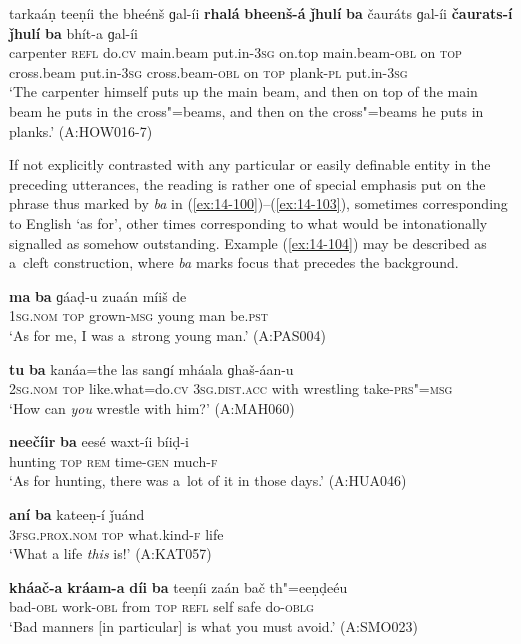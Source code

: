 \begin{exe}
\ex
\label{ex:14-99}
\gll tarkaáṇ teeṇíi the bheénš ɡal-íi  \textbf{rhalá} \textbf{bheenš-á} \textbf{ǰhulí} \textbf{ba} čauráts ɡal-íi \textbf{čaurats-í} \textbf{ǰhulí} \textbf{ba} bhít-a ɡal-íi\\
carpenter \textsc{refl} do.\textsc{cv} main.beam put.in-\textsc{3sg} on.top main.beam-\textsc{obl} on \textsc{top} cross.beam put.in-\textsc{3sg} cross.beam-\textsc{obl} on \textsc{top} plank-\textsc{pl} put.in-\textsc{3sg}\\
\glt `The carpenter himself puts up the main beam, and then on top of the main beam he puts in the cross"=beams, and then on the cross"=beams he puts in planks.' (A:HOW016-7)
\end{exe}

If not explicitly contrasted with any particular or easily definable entity in the preceding utterances, the reading is rather one of special emphasis put on the phrase thus marked by \textit{ba} in (\ref{ex:14-100})--(\ref{ex:14-103}), sometimes corresponding to English `as for', other times corresponding to what would be intonationally signalled as somehow outstanding. Example (\ref{ex:14-104}) may be described as a~cleft construction, where \textit{ba} marks focus that precedes the background.

\begin{exe}
\ex
\label{ex:14-100}
\gll \textbf{ma} \textbf{ba} ɡáaḍ-u zuaán míiš de \\
\textsc{1sg.nom} \textsc{top} grown-\textsc{msg} young man be.\textsc{pst}  \\
\glt `As for me, I was a~strong young man.' (A:PAS004)

\ex
\label{ex:14-101}
\gll \textbf{tu} \textbf{ba} kanáa=the las sanɡí  mháala ɡhaš-áan-u\\
\textsc{2sg.nom} \textsc{top} like.what=do.\textsc{cv} \textsc{3sg.dist.acc} with wrestling take-\textsc{prs"=msg}\\
\glt `How can \textit{you} wrestle with him?' (A:MAH060)

\ex
\label{ex:14-102}
\gll \textbf{neečíir} \textbf{ba} eesé waxt-íi bíiḍ-i \\
hunting \textsc{top} \textsc{rem} time-\textsc{gen} much-\textsc{f } \\
\glt `As for hunting, there was a~lot of it in those days.' (A:HUA046)

\ex
\label{ex:14-103}
\gll \textbf{aní} \textbf{ba} kateeṇ-í ǰuánd \\
\textsc{3fsg.prox.nom} \textsc{top} what.kind-\textsc{f} life  \\
\glt `What a life \textit{this} is!' (A:KAT057)

\ex
\label{ex:14-104}
\gll \textbf{kháač-a} \textbf{kráam-a} \textbf{díi} \textbf{ba} teeṇíi zaán bač th"=eeṇḍeéu \\
bad-\textsc{obl} work-\textsc{obl } from \textsc{top} \textsc{refl} self safe do-\textsc{oblg} \\
\glt `Bad manners [in particular] is what you must avoid.' (A:SMO023)
\end{exe}

